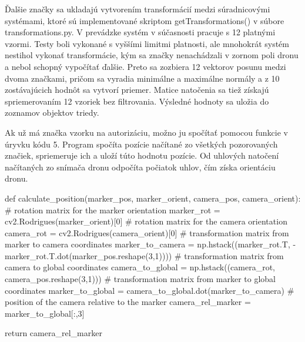 Ďalšie značky sa ukladajú vytvorením transformácií medzi súradnicovými systémami, ktoré sú implementované skriptom getTransformations() v súbore transformations.py. V prevádzke systém v súčasnosti pracuje s 12 platnými vzormi. Testy boli vykonané s vyššími limitmi platnosti, ale mnohokrát systém nestihol vykonať transformácie, kým sa značky nenachádzali v zornom poli dronu a nebol schopný vypočítať ďalšie. Preto sa zozbiera 12 vektorov posunu medzi dvoma značkami, pričom sa vyradia minimálne a maximálne normály a z 10 zostávajúcich hodnôt sa vytvorí priemer. Matice natočenia sa tiež získajú spriemerovaním 12 vzoriek bez filtrovania. Výsledné hodnoty sa uložia do zoznamov objektov triedy.

Ak už má značka vzorku na autorizáciu, možno ju spočítať pomocou funkcie v úryvku kódu 5. Program spočíta pozície načítané zo všetkých pozorovaných značiek, spriemeruje ich a uloží túto hodnotu pozície. Od uhlových natočení načítaných zo snímača dronu odpočíta počiatok uhlov, čím získa orientáciu dronu.
\begin{mypython}[caption={Vypočíta polohu kamery vzhľadom na značku},label=CL-4]
    def calculate_position(marker_pos, marker_orient, camera_pos, camera_orient):
    # rotation matrix for the marker orientation
    marker_rot = cv2.Rodrigues(marker_orient)[0]
    # rotation matrix for the camera orientation
    camera_rot = cv2.Rodrigues(camera_orient)[0]
    # transformation matrix from marker to camera coordinates
    marker_to_camera = np.hstack((marker_rot.T, -marker_rot.T.dot(marker_pos.reshape(3,1))))
    # transformation matrix from camera to global coordinates
    camera_to_global = np.hstack((camera_rot, camera_pos.reshape(3,1)))
    # transformation matrix from marker to global coordinates
    marker_to_global = camera_to_global.dot(marker_to_camera)
    # position of the camera relative to the marker
    camera_rel_marker = marker_to_global[:,3]
    
    return camera_rel_marker
\end{mypython}
